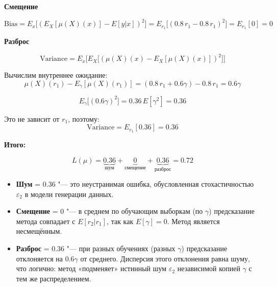 \documentclass[12pt,a4paper]{article}
\begin{document}
\textbf{Смещение}

\[
\text{Bias} = E_x\bigl[(E_X[\mu(X)(x)] - E[y|x])^2\bigr]
= E_{r_1}\bigl[(0.8\,r_1 - 0.8\,r_1)^2\bigr]
= E_{r_1}[0] = 0
\]

\textbf{ Разброс}

\[
\text{Variance} = E_x\bigl[E_X\bigl[(\mu(X)(x) - E_X[\mu(X)(x)])^2
\bigr]\bigr]
\]

Вычислим внутреннее ожидание:
\[
\mu(X)(r_1) - E_\gamma[\mu(X)(r_1)]
= (0.8\,r_1 + 0.6\gamma) - 0.8\,r_1 = 0.6\gamma
\]

\[
E_\gamma\bigl[(0.6\gamma)^2\bigr] = 0.36\,E[\gamma^2] = 0.36
\]

Это не зависит от $r_1$, поэтому:
\[
\text{Variance} = E_{r_1}[0.36] = 0.36
\]

\textbf{Итого:}

\[
L(\mu) = \underbrace{0.36}_{\text{шум}} +
\underbrace{0}_{\text{смещение}} +
\underbrace{0.36}_{\text{разброс}} = 0.72
\]

\begin{itemize}
    \item \textbf{Шум} = 0.36 "--- это неустранимая ошибка, обусловленная
    стохастичностью $\varepsilon_2$ в модели генерации данных.
    \item \textbf{Смещение} = 0 "--- в среднем по обучающим выборкам (по
    $\gamma$) предсказание метода совпадает с $E[r_2|r_1]$, так как
    $E[\gamma] = 0$. Метод является несмещённым.
    \item \textbf{Разброс} = 0.36 "--- при разных обучениях (разных $\gamma$)
    предсказание отклоняется на $0.6\gamma$ от среднего. Дисперсия этого
    отклонения равна шуму, что логично: метод «подменяет» истинный шум
    $\varepsilon_2$ независимой копией $\gamma$ с тем же распределением.
\end{itemize}
\end{document}
